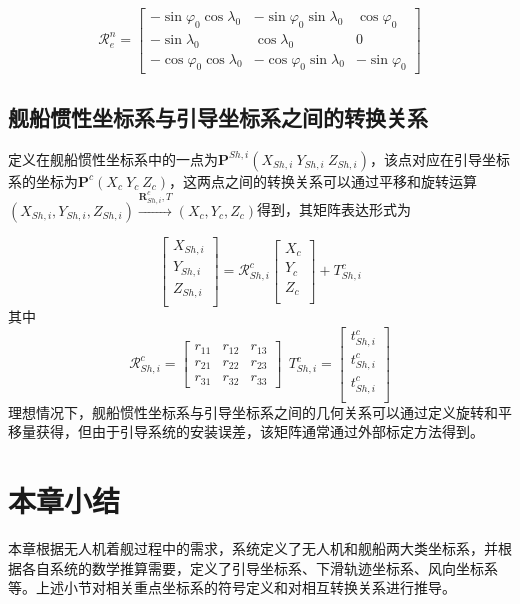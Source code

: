 \begin{equation}
\mathcal{R}_e^n=\left[\begin{array}{ccc}
-\sin \varphi _{0} \cos \lambda _{0} & -\sin \varphi _{0} \sin \lambda _{0} & \cos \varphi _{0}  \\
-\sin \lambda _{0}           &           \cos \lambda _{0}            &          0           \\
-\cos \varphi _{0} \cos \lambda _{0} & -\cos \varphi _{0} \sin \lambda _{0} & -\sin \varphi _{0}
\end{array}\right]
\end{equation}

\subsection{舰船惯性坐标系与引导坐标系之间的转换关系}
定义在舰船惯性坐标系中的一点为$\mathbf{P}^{Sh,i}(X_{Sh,i}\ Y_{Sh,i}\ Z_{Sh,i})$，该点对应在引导坐标系的坐标为$\mathbf{P}^{c}(X_c\ Y_c\ Z_c)$，这两点之间的转换关系可以通过平移和旋转运算$(X_{Sh,i}, Y_{Sh,i}, Z_{Sh,i})\xrightarrow{\textbf{R}_{Sh,i}^c,T}(X_c, Y_c, Z_c) $得到，其矩阵表达形式为

\begin{equation}
\left[\begin{array}{c}
X_{Sh,i}\\
Y_{Sh,i}\\
Z_{Sh,i}\\
\end{array}\right]=\mathcal{R}_{Sh,i}^c
\left[\begin{array}{c}
X_{c}\\
Y_{c}\\
Z_{c}\\
\end{array}\right]+T_{Sh,i}^c
\end{equation}
其中
\begin{equation}
\mathcal{R}_{Sh,i}^c=\left[\begin{array}{ccc}
r_{11} & r_{12} & r_{13} \\
r_{21} & r_{22} & r_{23} \\
r_{31} & r_{32} & r_{33} 
\end{array}\right]
\ \ 
T_{Sh,i}^c=\left[\begin{array}{ccc}
t_{Sh,i}^c\\
t_{Sh,i}^c\\
t_{Sh,i}^c\\
\end{array}\right]
\end{equation}
理想情况下，舰船惯性坐标系与引导坐标系之间的几何关系可以通过定义旋转和平移量获得，但由于引导系统的安装误差，该矩阵通常通过外部标定方法得到。


\section{本章小结}
本章根据无人机着舰过程中的需求，系统定义了无人机和舰船两大类坐标系，并根据各自系统的数学推算需要，定义了引导坐标系、下滑轨迹坐标系、风向坐标系等。上述小节对相关重点坐标系的符号定义和对相互转换关系进行推导。




